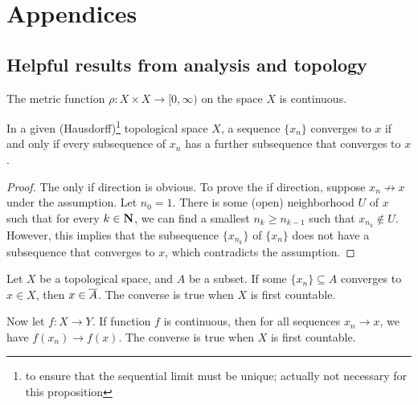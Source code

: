 \chapter*{\Large Appendices}
\makeatletter
\renewcommand\thesection{\@Alph\c@section}
\makeatother

\section{Helpful results from analysis and topology} \label{sec:helpful-analysis}
\begin{fact} \label{fact:cont-metric}
    The metric function $\rho\colon X\times X\to [0,\infty)$ on the space $X$ is continuous.
\end{fact}

\begin{prop} \label{prop:subseq-further-subseq-top-space}
    In a given (Hausdorff)\footnote{to ensure that the sequential limit must be unique; actually not necessary for this proposition} topological space $X$, a sequence $\{x_n\}$ converges to $x$ if and only if every subsequence of $x_n$ has a further subsequence that converges to $x$.
\end{prop}
\begin{proof}
    The only if direction is obvious. To prove the if direction, suppose $x_n \not\to x$ under the assumption. Let $n_0 = 1$. There is some (open) neighborhood $U$ of $x$ such that for every $k\in \mathbf{N}$, we can find a smallest $n_k \geq n_{k-1}$ such that $x_{n_k} \notin U$. However, this implies that the subsequence $\{x_{n_k}\}$ of $\{x_n\}$ does not have a subsequence that converges to $x$, which contradicts the assumption.
\end{proof}



\begin{thm} \label{thm:seq-cont-1st-countable}
    Let $X$ be a topological space, and $A$ be a subset. If some $\{x_n\} \subseteq A$ converges to $x\in X$, then $x \in \overline{A}$. The converse is true when $X$ is first countable.

    Now let $f \colon X \to Y$. If function $f$ is continuous, then for all sequences $x_n \to x$, we have $f(x_n) \to f(x)$. The converse is true when $X$ is first countable.
\end{thm}

